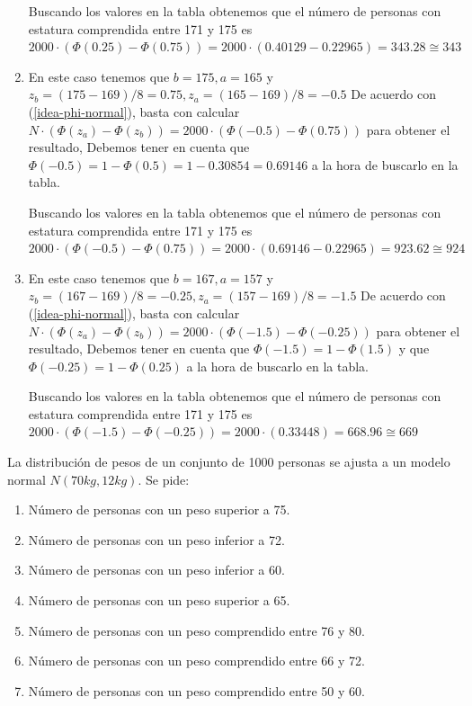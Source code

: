 \begin{enumerate}
  Buscando los valores en la tabla obtenemos que el número de personas
  con estatura comprendida entre 171 y 175 es
  \(2000\cdot (\Phi(0.25) - \Phi(0.75)) = 2000 \cdot (0.40129 - 0.22965) = 343.28 \cong 343\)
\item
  En este caso tenemos que \(b = 175, a =165\) y
  \(z_b = (175-169)/8=0.75, z_a = (165-169)/8=-0.5\) De acuerdo con
  (\protect\hyperlink{idea-phi-normal}{{[}idea-phi-normal{]}}), basta
  con calcular
  \(N\cdot (\Phi(z_a) - \Phi(z_b))= 2000\cdot (\Phi(-0.5) - \Phi(0.75))\)
  para obtener el resultado, Debemos tener en cuenta que
  \(\Phi(-0.5) = 1-\Phi(0.5)= 1-0.30854 = 0.69146\) a la hora de
  buscarlo en la tabla.

  Buscando los valores en la tabla obtenemos que el número de personas
  con estatura comprendida entre 171 y 175 es
  \(2000\cdot (\Phi(-0.5) - \Phi(0.75)) = 2000 \cdot (0.69146 - 0.22965) = 923.62 \cong 924\)
\item
  En este caso tenemos que \(b = 167, a =157\) y
  \(z_b = (167-169)/8=-0.25, z_a = (157-169)/8=-1.5\) De acuerdo con
  (\protect\hyperlink{idea-phi-normal}{{[}idea-phi-normal{]}}), basta
  con calcular
  \(N\cdot (\Phi(z_a) - \Phi(z_b))= 2000\cdot (\Phi(-1.5) - \Phi(-0.25))\)
  para obtener el resultado, Debemos tener en cuenta que
  \(\Phi(-1.5) = 1-\Phi(1.5)\) y que \(\Phi(-0.25) = 1-\Phi(0.25)\) a la
  hora de buscarlo en la tabla.

  Buscando los valores en la tabla obtenemos que el número de personas
  con estatura comprendida entre 171 y 175 es
  \(2000\cdot (\Phi(-1.5) - \Phi(-0.25)) = 2000 \cdot (0.33448) = 668.96 \cong 669\)
\end{enumerate}

La distribución de pesos de un conjunto de 1000 personas se ajusta a un
modelo normal \(N(70kg,12kg)\). Se pide:

\begin{enumerate}
\def\labelenumi{\arabic{enumi}.}
\item
  Número de personas con un peso superior a 75.
\item
  Número de personas con un peso inferior a 72.
\item
  Número de personas con un peso inferior a 60.
\item
  Número de personas con un peso superior a 65.
\item
  Número de personas con un peso comprendido entre 76 y 80.
\item
  Número de personas con un peso comprendido entre 66 y 72.
\item
  Número de personas con un peso comprendido entre 50 y 60.
\end{enumerate}

